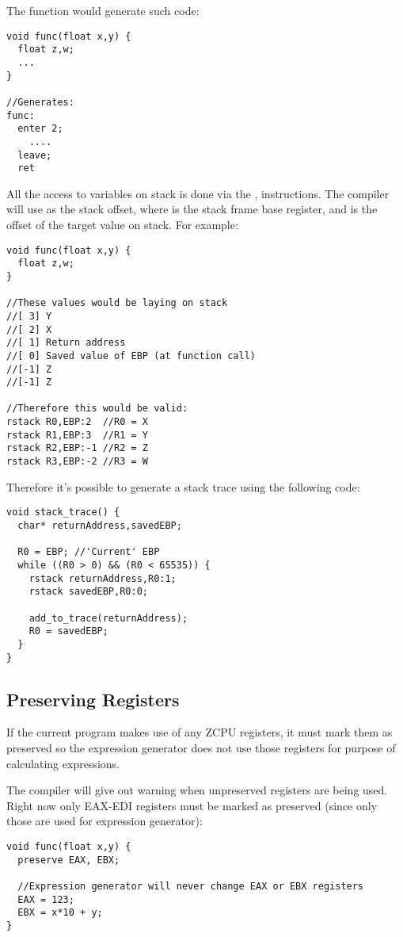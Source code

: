 The function would generate such code:
\begin{verbatim}
void func(float x,y) {
  float z,w;
  ...
}

//Generates:
func:
  enter 2;
    ....
  leave;
  ret
\end{verbatim}

All the access to variables on stack is done via the ,  instructions. The compiler will use  as the stack offset, where  is the stack frame base register, and  is the offset of the target value on stack. For example:
\begin{verbatim}
void func(float x,y) {
  float z,w;
}

//These values would be laying on stack
//[ 3] Y
//[ 2] X
//[ 1] Return address
//[ 0] Saved value of EBP (at function call)
//[-1] Z
//[-1] Z

//Therefore this would be valid:
rstack R0,EBP:2  //R0 = X
rstack R1,EBP:3  //R1 = Y
rstack R2,EBP:-1 //R2 = Z
rstack R3,EBP:-2 //R3 = W
\end{verbatim}

Therefore it's possible to generate a stack trace using the following code:
\begin{verbatim}
void stack_trace() {
  char* returnAddress,savedEBP;
  
  R0 = EBP; //'Current' EBP
  while ((R0 > 0) && (R0 < 65535)) {
    rstack returnAddress,R0:1;
    rstack savedEBP,R0:0;    
    
    add_to_trace(returnAddress);    
    R0 = savedEBP;
  }
}
\end{verbatim}

\subsection{Preserving Registers} \label{preserve}
If the current program makes use of any ZCPU registers, it must mark them as preserved so the expression generator does not use those registers for purpose of calculating expressions.

The compiler will give out warning when unpreserved registers are being used. Right now only EAX-EDI registers must be marked as preserved (since only those are used for expression generator):
\begin{verbatim}
void func(float x,y) {
  preserve EAX, EBX;
  
  //Expression generator will never change EAX or EBX registers
  EAX = 123;
  EBX = x*10 + y;
}
\end{verbatim}









